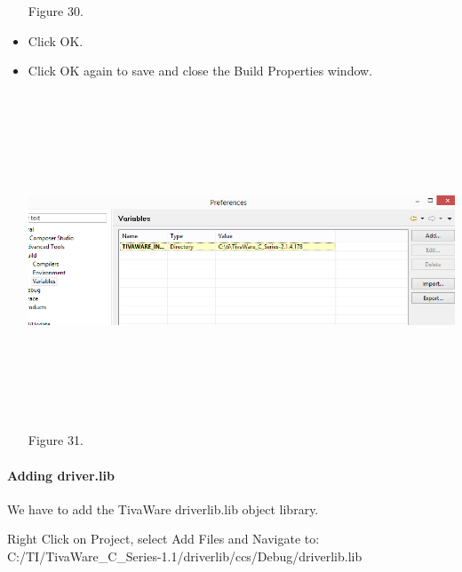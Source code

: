 \documentclass[a4paper,10pt,oneside]{article}
\begin{document}
\begin{itemize}
\begin{center}
						Figure 30.	
					\end{center}
						\item  Click OK.
						\item  Click OK again to save and close
						the Build Properties window.\\
						\begin{center}
							\includegraphics[width=20cm,height=10cm]{Images/AddVariables9}\\
							Figure 31.	
						\end{center}
					\end{itemize}
					\paragraph{\textbf{Adding driver.lib}}
					We have to add the TivaWare driverlib.lib object library. 
					\begin{center}
						Right Click on Project, select Add Files and Navigate to: \\	
						C:/TI/TivaWare\_C\_Series-1.1/driverlib/ccs/Debug/driverlib.lib \\
					\end{center}
\end{document}
